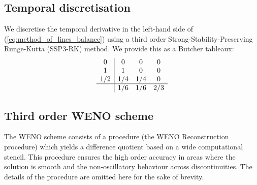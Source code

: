 \documentclass{amsart}
\theoremstyle{definition}
\theoremstyle{remark}
\numberwithin{equation}{section}
\begin{document}
\subsection{Temporal discretisation}
We discretise the temporal derivative in the left-hand side of (\ref{eq:method_of_lines_balance}) using a third order  Strong-Stability-Preserving Runge-Kutta (SSP3-RK) method.  We provide this as a Butcher tableaux:
\begin{equation}\label{defn:SSP3-temp}
\begin{array}{c|ccc}0&0&0&0\\1&1&0&0\\1/2&1/4&1/4&0\\\hline &1/6&1/6&2/3\\\end{array}
\end{equation} 

\subsection{Third order WENO scheme}
The WENO scheme consists of a procedure (the WENO Reconstruction procedure) which yields a difference quotient based on a wide computational stencil.  This procedure ensures the high order accuracy in areas where the solution is smooth and the non-oscillatory behaviour across discontinuities.  The details of the procedure are omitted here for the sake of brevity.  
\end{document}
